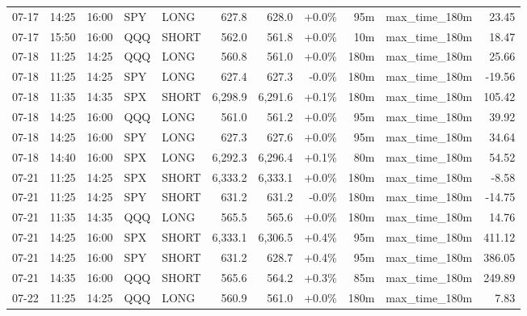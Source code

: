 \documentclass[11pt,a4paper,twoside]{article}
\begin{document}
\begin{center}
\begin{longtable}{>{\color{txtmain}}l l l l l r r r r >{\color{txtmain}}l r}
07-17 & 14:25 & 16:00 & SPY & LONG & 627.8 & 628.0 & \textcolor{wingreen}{+0.0\%} & 95m & max\_time\_180m & \textcolor{wingreen}{23.45} \\
07-17 & 15:50 & 16:00 & QQQ & SHORT & 562.0 & 561.8 & \textcolor{wingreen}{+0.0\%} & 10m & max\_time\_180m & \textcolor{wingreen}{18.47} \\
07-18 & 11:25 & 14:25 & QQQ & LONG & 560.8 & 561.0 & \textcolor{wingreen}{+0.0\%} & 180m & max\_time\_180m & \textcolor{wingreen}{25.66} \\
07-18 & 11:25 & 14:25 & SPY & LONG & 627.4 & 627.3 & \textcolor{lossred}{-0.0\%} & 180m & max\_time\_180m & \textcolor{lossred}{-19.56} \\
07-18 & 11:35 & 14:35 & SPX & SHORT & 6,298.9 & 6,291.6 & \textcolor{wingreen}{+0.1\%} & 180m & max\_time\_180m & \textcolor{wingreen}{105.42} \\
07-18 & 14:25 & 16:00 & QQQ & LONG & 561.0 & 561.2 & \textcolor{wingreen}{+0.0\%} & 95m & max\_time\_180m & \textcolor{wingreen}{39.92} \\
07-18 & 14:25 & 16:00 & SPY & LONG & 627.3 & 627.6 & \textcolor{wingreen}{+0.0\%} & 95m & max\_time\_180m & \textcolor{wingreen}{34.64} \\
07-18 & 14:40 & 16:00 & SPX & LONG & 6,292.3 & 6,296.4 & \textcolor{wingreen}{+0.1\%} & 80m & max\_time\_180m & \textcolor{wingreen}{54.52} \\
07-21 & 11:25 & 14:25 & SPX & SHORT & 6,333.2 & 6,333.1 & \textcolor{wingreen}{+0.0\%} & 180m & max\_time\_180m & \textcolor{lossred}{-8.58} \\
07-21 & 11:25 & 14:25 & SPY & SHORT & 631.2 & 631.2 & \textcolor{lossred}{-0.0\%} & 180m & max\_time\_180m & \textcolor{lossred}{-14.75} \\
07-21 & 11:35 & 14:35 & QQQ & LONG & 565.5 & 565.6 & \textcolor{wingreen}{+0.0\%} & 180m & max\_time\_180m & \textcolor{wingreen}{14.76} \\
07-21 & 14:25 & 16:00 & SPX & SHORT & 6,333.1 & 6,306.5 & \textcolor{wingreen}{+0.4\%} & 95m & max\_time\_180m & \textcolor{wingreen}{411.12} \\
07-21 & 14:25 & 16:00 & SPY & SHORT & 631.2 & 628.7 & \textcolor{wingreen}{+0.4\%} & 95m & max\_time\_180m & \textcolor{wingreen}{386.05} \\
07-21 & 14:35 & 16:00 & QQQ & SHORT & 565.6 & 564.2 & \textcolor{wingreen}{+0.3\%} & 85m & max\_time\_180m & \textcolor{wingreen}{249.89} \\
07-22 & 11:25 & 14:25 & QQQ & LONG & 560.9 & 561.0 & \textcolor{wingreen}{+0.0\%} & 180m & max\_time\_180m & \textcolor{wingreen}{7.83} \\

\end{longtable}
\end{center}
\end{document}
